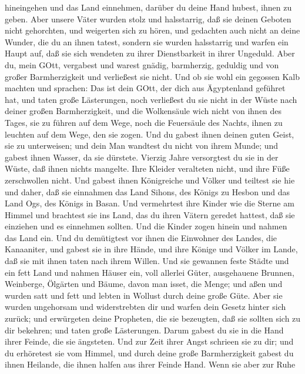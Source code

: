hineingehen und das Land einnehmen, darüber du deine Hand hubest, ihnen
zu geben.  Aber unsere Väter wurden stolz und halsstarrig,
daß sie deinen Geboten nicht gehorchten,  und weigerten
sich zu hören, und gedachten auch nicht an deine Wunder, die du an ihnen
tatest, sondern sie wurden halsstarrig und warfen ein Haupt auf, daß sie
sich wendeten zu ihrer Dienstbarkeit in ihrer Ungeduld. Aber du, mein
GOtt, vergabest und warest gnädig, barmherzig, geduldig und von großer
Barmherzigkeit und verließest sie nicht.  Und ob sie wohl
ein gegossen Kalb machten und sprachen: Das ist dein GOtt, der dich aus
Ägyptenland geführet hat, und taten große Lästerungen, 
noch verließest du sie nicht in der Wüste nach deiner großen
Barmherzigkeit, und die Wolkensäule wich nicht von ihnen des Tages, sie
zu führen auf dem Wege, noch die Feuersäule des Nachts, ihnen zu
leuchten auf dem Wege, den sie zogen.  Und du gabest ihnen
deinen guten Geist, sie zu unterweisen; und dein Man wandtest du nicht
von ihrem Munde; und gabest ihnen Wasser, da sie dürstete. 
Vierzig Jahre versorgtest du sie in der Wüste, daß ihnen nichts
mangelte. Ihre Kleider veralteten nicht, und ihre Füße zerschwollen
nicht.  Und gabest ihnen Königreiche und Völker und
teiltest sie hie und daher, daß sie einnahmen das Land Sihons, des
Königs zu Hesbon und das Land Ogs, des Königs in Basan. 
Und vermehrtest ihre Kinder wie die Sterne am Himmel und brachtest sie
ins Land, das du ihren Vätern geredet hattest, daß sie einziehen und es
einnehmen sollten.  Und die Kinder zogen hinein und nahmen
das Land ein. Und du demütigtest vor ihnen die Einwohner des Landes, die
Kanaaniter, und gabest sie in ihre Hände, und ihre Könige und Völker im
Lande, daß sie mit ihnen taten nach ihrem Willen.  Und sie
gewannen feste Städte und ein fett Land und nahmen Häuser ein, voll
allerlei Güter, ausgehauene Brunnen, Weinberge, Ölgärten und Bäume,
davon man isset, die Menge; und aßen und wurden satt und fett und lebten
in Wollust durch deine große Güte.  Aber sie wurden
ungehorsam und widerstrebten dir und warfen dein Gesetz hinter sich
zurück; und erwürgeten deine Propheten, die sie bezeugten, daß sie
sollten sich zu dir bekehren; und taten große Lästerungen. 
Darum gabest du sie in die Hand ihrer Feinde, die sie ängsteten. Und zur
Zeit ihrer Angst schrieen sie zu dir; und du erhöretest sie vom Himmel,
und durch deine große Barmherzigkeit gabest du ihnen Heilande, die ihnen
halfen aus ihrer Feinde Hand.  Wenn sie aber zur Ruhe
